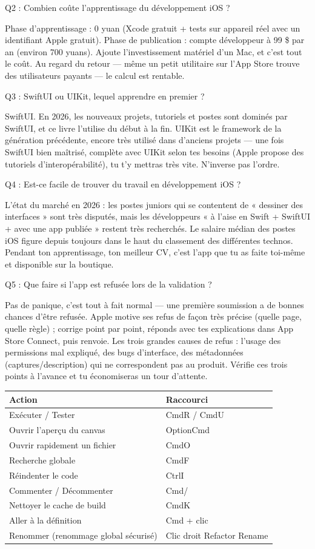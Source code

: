 Q2 : Combien coûte l'apprentissage du développement iOS ?

Phase d'apprentissage : 0 yuan (Xcode gratuit + tests sur appareil réel avec un identifiant Apple gratuit). Phase de publication : compte développeur à 99 \$ par an (environ 700 yuans). Ajoute l'investissement matériel d'un Mac, et c'est tout le coût. Au regard du retour — même un petit utilitaire sur l'App Store trouve des utilisateurs payants — le calcul est rentable.

Q3 : SwiftUI ou UIKit, lequel apprendre en premier ?

SwiftUI. En 2026, les nouveaux projets, tutoriels et postes sont dominés par SwiftUI, et ce livre l'utilise du début à la fin. UIKit est le framework de la génération précédente, encore très utilisé dans d'anciens projets — une fois SwiftUI bien maîtrisé, complète avec UIKit selon tes besoins (Apple propose des tutoriels d'interopérabilité), tu t'y mettras très vite. N'inverse pas l'ordre.

Q4 : Est-ce facile de trouver du travail en développement iOS ?

L'état du marché en 2026 : les postes juniors qui se contentent de « dessiner des interfaces » sont très disputés, mais les développeurs « à l'aise en Swift + SwiftUI + avec une app publiée » restent très recherchés. Le salaire médian des postes iOS figure depuis toujours dans le haut du classement des différentes technos. Pendant ton apprentissage, ton meilleur CV, c'est l'app que tu as faite toi-même et disponible sur la boutique.

Q5 : Que faire si l'app est refusée lors de la validation ?

Pas de panique, c'est tout à fait normal — une première soumission a de bonnes chances d'être refusée. Apple motive ses refus de façon très précise (quelle page, quelle règle) ; corrige point par point, réponds avec tes explications dans App Store Connect, puis renvoie. Les trois grandes causes de refus : l'usage des permissions mal expliqué, des bugs d'interface, des métadonnées (captures/description) qui ne correspondent pas au produit. Vérifie ces trois points à l'avance et tu économiseras un tour d'attente.


\begin{center}
\begin{tabularx}{\linewidth}{|X|X|}
\hline
\textbf{Action} & \textbf{Raccourci} \tabularnewline
\hline
Exécuter / Tester & CmdR / CmdU \tabularnewline
Ouvrir l'aperçu du canvas & OptionCmd \tabularnewline
Ouvrir rapidement un fichier & CmdO \tabularnewline
Recherche globale & CmdF \tabularnewline
Réindenter le code & CtrlI \tabularnewline
Commenter / Décommenter & Cmd/ \tabularnewline
Nettoyer le cache de build & CmdK \tabularnewline
Aller à la définition & Cmd + clic \tabularnewline
Renommer (renommage global sécurisé) & Clic droit Refactor Rename \tabularnewline
\hline
\end{tabularx}
\end{center}

